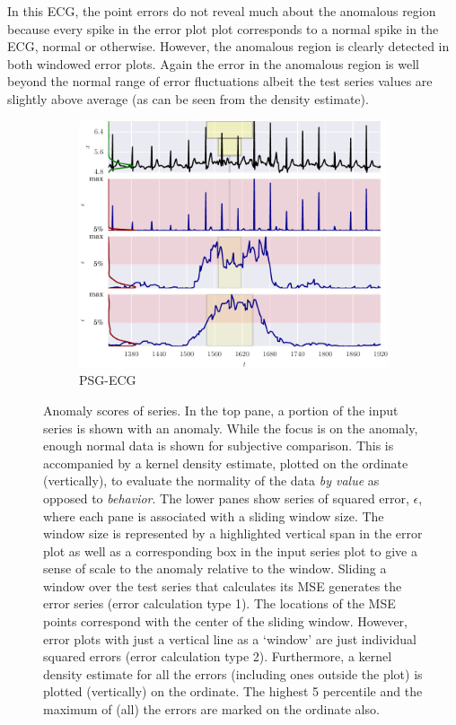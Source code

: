 
In this ECG, the point errors do not reveal much about the anomalous region because every spike in the error plot plot corresponds to a normal spike in the ECG, normal or otherwise.
%
However, the anomalous region is clearly detected in both windowed error plots.
%
Again the error in the anomalous region is well beyond the normal range of error fluctuations albeit the test series values are slightly above average (as can be seen from the density estimate).

\begin{figure}[!hp] 
    \ContinuedFloat

    \begin{subfigure}[t]{\textwidth} 
        \centering
        \includegraphics[]{figs/er_sleep.pdf}
        \caption{PSG-ECG}
    \end{subfigure}%

\caption[Anomaly scores of series]{Anomaly scores of series.
%
In the top pane, a portion of the input series is shown with an anomaly.
%
While the focus is on the anomaly, enough normal data is shown for subjective comparison.
%
This is accompanied by a kernel density estimate, plotted on the ordinate (vertically), to evaluate the normality of the data \emph{by value} as opposed to \emph{behavior}.
%
The lower panes show series of squared error, $\epsilon$, where each pane is associated with a sliding window size.
%
The window size is represented by a highlighted vertical span in the error plot as well as a corresponding box in the input series plot to give a sense of scale to the anomaly relative to the window.
%
Sliding a window over the test series that calculates its MSE generates the error series (error calculation type 1).
%
The locations of the MSE points correspond with the center of the sliding window.
%
However, error plots with just a vertical line as a `window' are just individual squared errors (error calculation type 2).
%
Furthermore, a kernel density estimate for all the errors (including ones outside the plot) is plotted (vertically) on the ordinate.
%
The highest 5 percentile and the maximum of (all) the errors are marked on the ordinate also.
}
\label{fig:err}
\end{figure}

